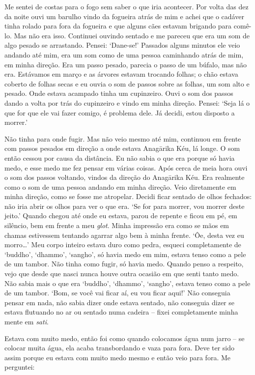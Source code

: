 Me sentei de costas para o fogo sem saber o que iria acontecer. Por
volta das dez da noite ouvi um barulho vindo da fogueira atrás de mim e
achei que o cadáver tinha rolado para fora da fogueira e que alguns cães
estavam brigando para comê-lo. Mas não era isso. Continuei ouvindo
sentado e me pareceu que era um som de algo pesado se arrastando.
Pensei: `Dane-se!' Passados alguns minutos ele veio andando até mim, era
um som como de uma pessoa caminhando atrás de mim, em minha direção. Era
um passo pesado, parecia o passo de um búfalo, mas não era. Estávamos em
março e as árvores estavam trocando folhas; o chão estava coberto de
folhas secas e eu ouvia o som de passos sobre as folhas, um som alto e
pesado. Onde estava acampado tinha um cupinzeiro. Ouvi o som dos passos
dando a volta por trás do cupinzeiro e vindo em minha direção. Pensei:
`Seja lá o que for que ele vai fazer comigo, é problema dele. Já decidi,
estou disposto a morrer.'

Não tinha para onde fugir. Mas não veio mesmo até mim, continuou em
frente com passos pesados em direção a onde estava Anagārika Kéu, lá
longe. O som então cessou por causa da distância. Eu não sabia o que era
porque só havia medo, e esse medo me fez pensar em várias coisas. Após
cerca de meia hora ouvi o som dos passos voltando, vindos da direção do
Anagārika Kéu. Era realmente como o som de uma pessoa andando em minha
direção. Veio diretamente em minha direção, como se fosse me atropelar.
Decidi ficar sentado de olhos fechados: não iria abrir os olhos para ver
o que era. `Se for para morrer, vou morrer deste jeito.' Quando chegou
até onde eu estava, parou de repente e ficou em pé, em silêncio, bem em
frente a meu \emph{glot}. Minha impressão era como se mãos em chamas
estivessem tentando agarrar algo bem à minha frente. `Ôe, desta vez eu
morro\ldots{}' Meu corpo inteiro estava duro como pedra, esqueci
completamente de `buddho', `dhammo', `sangho', só havia medo em mim,
estava tenso como a pele de um tambor. Não tinha como fugir, só havia
medo. Quando penso a respeito, vejo que desde que nasci nunca houve
outra ocasião em que senti tanto medo. Não sabia mais o que era
`buddho', `dhammo', `sangho', estava tenso como a pele de um tambor.
`Bom, se você vai ficar aí, eu vou ficar aqui!' Não conseguia pensar em
nada, não sabia dizer onde estava sentado, não conseguia dizer se estava
flutuando no ar ou sentado numa cadeira -- fixei completamente minha
mente em \emph{sati}.

Estava com muito medo, então foi como quando colocamos água num jarro --
se colocar muita água, ela acaba transbordando e vaza para fora. Deve
ter sido assim porque eu estava com muito medo mesmo e então veio para
fora. Me perguntei:

